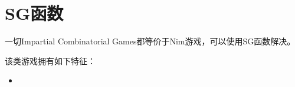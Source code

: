 \section{SG函数}
一切Impartial Combinatorial Games都等价于Nim游戏，可以使用SG函数解决。

该类游戏拥有如下特征：

\begin{itemize}

	\item

\end{itemize}
